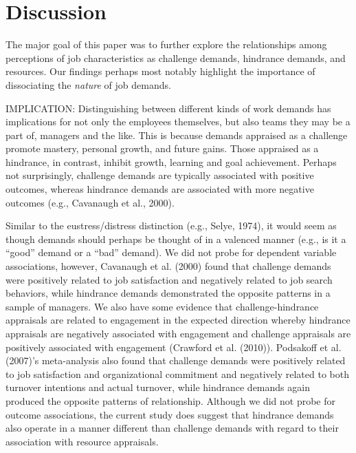 \documentclass[
  man]{apa6}
\begin{document}
\hypertarget{discussion}{%
\section{Discussion}\label{discussion}}

The major goal of this paper was to further explore the relationships among perceptions of job characteristics as challenge demands, hindrance demands, and resources. Our findings perhaps most notably highlight the importance of dissociating the \emph{nature} of job demands.

IMPLICATION: Distinguishing between different kinds of work demands has implications for not only the employees themselves, but also teams they may be a part of, managers and the like. This is because demands appraised as a challenge promote mastery, personal growth, and future gains. Those appraised as a hindrance, in contrast, inhibit growth, learning and goal achievement. Perhaps not surprisingly, challenge demands are typically associated with positive outcomes, whereas hindrance demands are associated with more negative outcomes (e.g., Cavanaugh et al., 2000).

Similar to the eustress/distress distinction (e.g., Selye, 1974), it would seem as though demands should perhaps be thought of in a valenced manner (e.g., is it a ``good'' demand or a ``bad'' demand). We did not probe for dependent variable associations, however, Cavanaugh et al. (2000) found that challenge demands were positively related to job satisfaction and negatively related to job search behaviors, while hindrance demands demonstrated the opposite patterns in a sample of managers. We also have some evidence that challenge-hindrance appraisals are related to engagement in the expected direction whereby hindrance appraisals are negatively associated with engagement and challenge appraisals are positively associated with engagement (Crawford et al. (2010)). Podsakoff et al. (2007)'s meta-analysis also found that challenge demands were positively related to job satisfaction and organizational commitment and negatively related to both turnover intentions and actual turnover, while hindrance demands again produced the opposite patterns of relationship. Although we did not probe for outcome associations, the current study does suggest that hindrance demands also operate in a manner different than challenge demands with regard to their association with resource appraisals.
\end{document}
